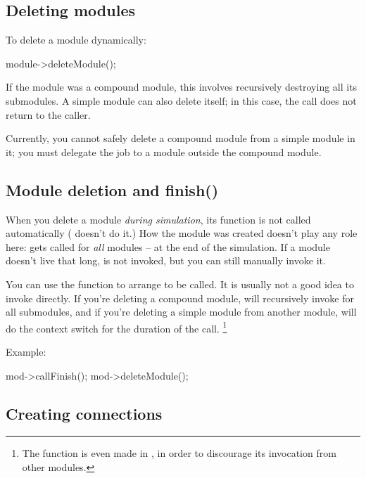 \subsection{Deleting modules}


To delete a module dynamically:

\begin{cpp}
module->deleteModule();
\end{cpp}

If the module was a compound module, this involves recursively
destroying all its submodules. A simple module can also delete itself;
in this case, the  call does not return to the
caller.

Currently, you cannot safely delete a
compound module from a simple module
in it; you must delegate the job to a module outside the compound
module.


\subsection{Module deletion and finish()}

When you delete a module \textit{during simulation}, its 
function is not called automatically ( doesn't do it.)
How the module was created doesn't play any role here:
 gets called for \textit{all} modules -- at the end of the
simulation. If a module doesn't live that long,  is not
invoked, but you can still manually invoke it.

You can use the  function to arrange 
to be called. It is usually not a good idea to invoke 
directly. If you're deleting a compound module,  will
recursively invoke  for all submodules, and if you're deleting
a simple module from another module,  will do the context
switch for the duration of the call.
  \footnote{The  function is even made 
  in , in order to discourage its invocation from
  other modules.}

Example:

\begin{cpp}
mod->callFinish();
mod->deleteModule();
\end{cpp}


\subsection{Creating connections}


